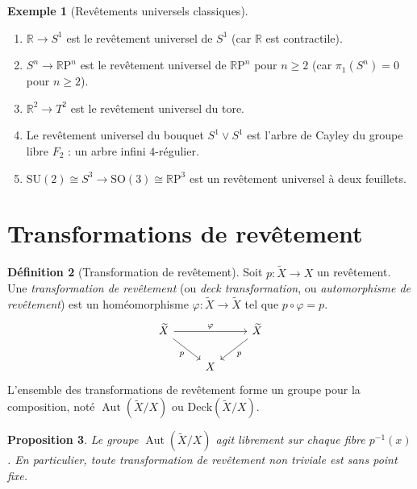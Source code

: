 \documentclass[12pt,a4paper,openany]{book}
\theoremstyle{definition}
\newtheorem{definition}{Définition}[chapter]
\newtheorem{exemple}[definition]{Exemple}
\theoremstyle{plain}
\newtheorem{proposition}[definition]{Proposition}
\theoremstyle{remark}
\newcommand{\R}{\mathbb{R}}
\newcommand{\RP}{\mathbb{R}\mathrm{P}}
\DeclareMathOperator{\Aut}{Aut}
\begin{document}
\begin{exemple}[Revêtements universels classiques]\label{ex:rev-universels}
\begin{enumerate}[label=(\roman*)]
\item $\R \to S^1$ est le revêtement universel de $S^1$ (car $\R$ est contractile).
\item $S^n \to \RP^n$ est le revêtement universel de $\RP^n$ pour $n \geq 2$
(car $\pi_1(S^n) = 0$ pour $n \geq 2$).
\item $\R^2 \to T^2$ est le revêtement universel du tore.
\item Le revêtement universel du bouquet $S^1 \vee S^1$ est l'arbre de Cayley
du groupe libre $F_2$ : un arbre infini $4$-régulier.
\item $\mathrm{SU}(2) \cong S^3 \to \mathrm{SO}(3) \cong \RP^3$ est un revêtement
universel à deux feuillets.
\end{enumerate}
\end{exemple}

\section{Transformations de revêtement}\label{sec:deck-transformations}

\begin{definition}[Transformation de revêtement]\label{def:deck}
Soit $p \colon \widetilde{X} \to X$ un revêtement. Une \emph{transformation de revêtement}
(ou \emph{deck transformation}, ou \emph{automorphisme de revêtement}) est un homéomorphisme
$\varphi \colon \widetilde{X} \to \widetilde{X}$ tel que $p \circ \varphi = p$.
\[
\begin{tikzcd}
\widetilde{X} \arrow[rr, "\varphi"] \arrow[dr, "p"'] & & \widetilde{X} \arrow[dl, "p"] \\
& X &
\end{tikzcd}
\]
L'ensemble des transformations de revêtement forme un groupe pour la composition, noté
$\Aut(\widetilde{X}/X)$ ou $\mathrm{Deck}(\widetilde{X}/X)$.
\end{definition}

\begin{proposition}\label{prop:deck-libre}
Le groupe $\Aut(\widetilde{X}/X)$ agit librement sur chaque fibre $p^{-1}(x)$.
En particulier, toute transformation de revêtement non triviale est sans point fixe.
\end{proposition}
\end{document}
